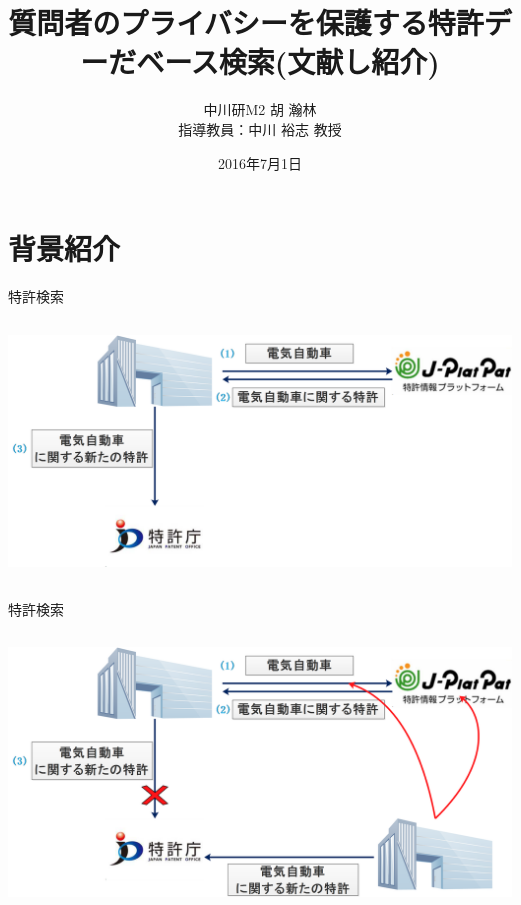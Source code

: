 \documentclass[14pt,xcolor=dvipsnames,table,dvipdfmx]{beamer}
\title{\bfseries 質問者のプライバシーを保護する特許デーだベース検索(文献し紹介)}
\date{2016年7月1日}
\author{中川研M2 胡 瀚林 \\ 指導教員：中川 裕志 教授}
\begin{document}
\maketitle
\frame{\tableofcontents[hideallsubsections]}

\section{背景紹介}
\begin{frame}{特許検索}
\begin{columns}[t]
    \begin{column}{0.8\textwidth} %
      	\includegraphics[width=\columnwidth]{rk1.png}
    \end{column}
\end{columns}
\end{frame}

\begin{frame}{特許検索}
\begin{columns}[t]
    \begin{column}{0.8\textwidth} %
      	\includegraphics[width=\columnwidth]{rk2.png}
    \end{column}
\end{columns}
\end{frame}
\end{document}
